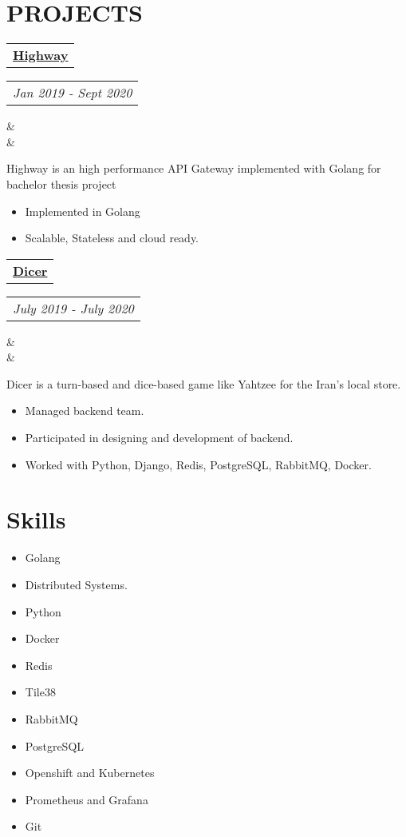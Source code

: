 \documentclass[11pt,a4paper,roman]{moderncv}        %
\makeatletter
\newcommand*{\customcvproject}[4][.25em]{
  \begin{tabular}{@{}l}
  {\bfseries #2}
  \end{tabular}
  \hfill%
  \begin{tabular}{l@{}}
  {\itshape #3}
  \end{tabular}
  \ifx&#4&%
  \else{\\%
    \begin{minipage}{\maincolumnwidth}%
      \small#4%
    \end{minipage}}\fi%
  \par\addvspace{#1}}
\makeatother
\begin{document}
  \cleardoublepage
  \section{PROJECTS}\label{sec:projects}
  {
    \customcvproject{\href{https://github.com/Highway-Project/highway}{Highway}}{Jan 2019 - Sept 2020}
    \\ Highway is an high performance API Gateway implemented with Golang for bachelor thesis project\\
    {
      \begin{itemize}
        \item Implemented in Golang
        \item Scalable, Stateless and cloud ready.\\
      \end{itemize}
    }
    \customcvproject{\href{https://cafebazaar.ir/app/info.medrick.dicer}{Dicer}}{July 2019 - July 2020}
    \\Dicer is a turn-based and dice-based game like Yahtzee for the Iran's local store.\\
    {
      \begin{itemize}
        \item Managed backend team.
        \item Participated in designing and development of backend.
        \item Worked with Python, Django, Redis, PostgreSQL, RabbitMQ, Docker.
      \end{itemize}
    }
  }
  \section{Skills}\label{sec:skills}
  \begin{minipage}{\maincolumnwidth}%
    \small{
      \begin{itemize}
        \item Golang
        \item Distributed Systems.
        \item Python
        \item Docker
        \item Redis
        \item Tile38
        \item RabbitMQ
        \item PostgreSQL
        \item Openshift and Kubernetes
        \item Prometheus and Grafana
        \item Git
      \end{itemize}}%
  \end{minipage}%
\end{document}
